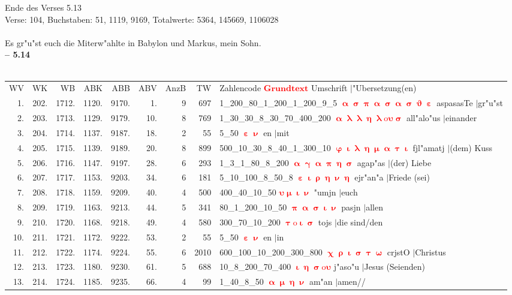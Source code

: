 \documentclass[a4paper,10pt,landscape]{article}
\begin{document}
Ende des Verses 5.13\\
Verse: 104, Buchstaben: 51, 1119, 9169, Totalwerte: 5364, 145669, 1106028\\
\\
Es gr"u"st euch die Miterw"ahlte in Babylon und Markus, mein Sohn.\\
\newpage 
{\bf -- 5.14}\\
\medskip \\
\begin{tabular}{rrrrrrrrp{120mm}}
WV&WK&WB&ABK&ABB&ABV&AnzB&TW&Zahlencode \textcolor{red}{$\boldsymbol{Grundtext}$} Umschrift $|$"Ubersetzung(en)\\
1.&202.&1712.&1120.&9170.&1.&9&697&1\_200\_80\_1\_200\_1\_200\_9\_5 \textcolor{red}{$\boldsymbol{\upalpha\upsigma\uppi\upalpha\upsigma\upalpha\upsigma\upvartheta\upepsilon}$} aspasasTe $|$gr"u"st\\
2.&203.&1713.&1129.&9179.&10.&8&769&1\_30\_30\_8\_30\_70\_400\_200 \textcolor{red}{$\boldsymbol{\upalpha\uplambda\uplambda\upeta\uplambda\mathrm{o}\upsilon\upsigma}$} all"alo"us $|$einander\\
3.&204.&1714.&1137.&9187.&18.&2&55&5\_50 \textcolor{red}{$\boldsymbol{\upepsilon\upnu}$} en $|$mit\\
4.&205.&1715.&1139.&9189.&20.&8&899&500\_10\_30\_8\_40\_1\_300\_10 \textcolor{red}{$\boldsymbol{\upvarphi\upiota\uplambda\upeta\upmu\upalpha\uptau\upiota}$} fjl"amatj $|$(dem) Kuss\\
5.&206.&1716.&1147.&9197.&28.&6&293&1\_3\_1\_80\_8\_200 \textcolor{red}{$\boldsymbol{\upalpha\upgamma\upalpha\uppi\upeta\upsigma}$} agap"as $|$(der) Liebe\\
6.&207.&1717.&1153.&9203.&34.&6&181&5\_10\_100\_8\_50\_8 \textcolor{red}{$\boldsymbol{\upepsilon\upiota\uprho\upeta\upnu\upeta}$} ejr"an"a $|$Friede (sei)\\
7.&208.&1718.&1159.&9209.&40.&4&500&400\_40\_10\_50 \textcolor{red}{$\boldsymbol{\upsilon\upmu\upiota\upnu}$} "umjn $|$euch\\
8.&209.&1719.&1163.&9213.&44.&5&341&80\_1\_200\_10\_50 \textcolor{red}{$\boldsymbol{\uppi\upalpha\upsigma\upiota\upnu}$} pasjn $|$allen\\
9.&210.&1720.&1168.&9218.&49.&4&580&300\_70\_10\_200 \textcolor{red}{$\boldsymbol{\uptau\mathrm{o}\upiota\upsigma}$} tojs $|$die sind/den\\
10.&211.&1721.&1172.&9222.&53.&2&55&5\_50 \textcolor{red}{$\boldsymbol{\upepsilon\upnu}$} en $|$in\\
11.&212.&1722.&1174.&9224.&55.&6&2010&600\_100\_10\_200\_300\_800 \textcolor{red}{$\boldsymbol{\upchi\uprho\upiota\upsigma\uptau\upomega}$} crjstO $|$Christus\\
12.&213.&1723.&1180.&9230.&61.&5&688&10\_8\_200\_70\_400 \textcolor{red}{$\boldsymbol{\upiota\upeta\upsigma\mathrm{o}\upsilon}$} j"aso"u $|$Jesus (Seienden)\\
13.&214.&1724.&1185.&9235.&66.&4&99&1\_40\_8\_50 \textcolor{red}{$\boldsymbol{\upalpha\upmu\upeta\upnu}$} am"an $|$amen//\\
\end{tabular}\medskip \\
\end{document}
